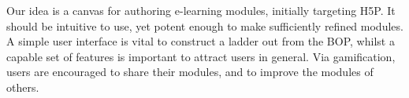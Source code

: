 Our idea is a canvas for authoring e-learning modules, initially targeting 
H5P. It should be intuitive to use, yet potent enough to make sufficiently 
refined modules. A simple user interface is vital to construct a ladder out 
from the BOP, whilst a capable set of features is important to attract users 
in general. Via gamification, users are encouraged to share their modules, and 
to improve the modules of others.
